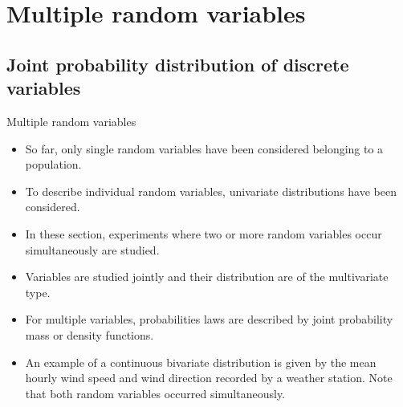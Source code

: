 \documentclass[8pt]{beamer}
\renewcommand{\emph}[1]{\textcolor{myorange}{#1}}
\begin{document}
\section{Multiple random variables} %

\subsection{Joint probability distribution of discrete variables} %
\begin{frame}{Multiple random variables}
    \begin{itemize}
        \item So far, only \emph{single random variables} have been considered belonging to a population.  
        \item To describe individual random variables, \emph{univariate distributions} have been considered.
        \item In these section, experiments where two or more random variables occur simultaneously are studied. 
        \item Variables are studied jointly and their distribution are of the multivariate type.
        \item For \emph{multiple variables}, probabilities laws are described by \emph{joint probability mass or density functions}.
        \item An example of a continuous bivariate distribution is given by the mean hourly wind speed and wind direction recorded by a weather station. Note that both random variables occurred simultaneously. 
    \end{itemize}
\end{frame}
\end{document}
